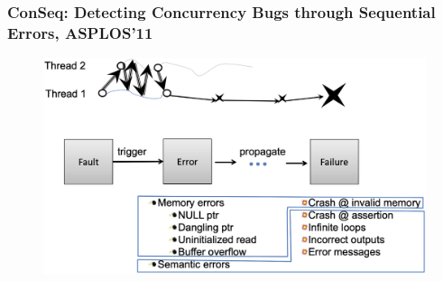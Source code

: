 % 
% 
% 
\begin{frame}[fragile]
    \frametitle{ConSeq: \small{Detecting Concurrency Bugs through Sequential Errors, ASPLOS’11}}
    \begin{figure}
    \includegraphics[width=0.75\linewidth]{figs/ConSeq.png}
    \end{figure}
\end{frame}
% 

